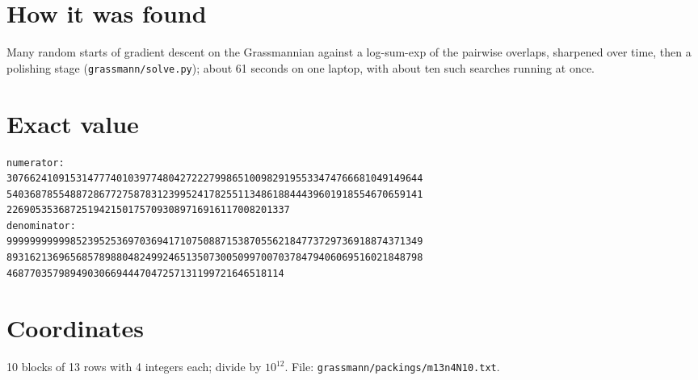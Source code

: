 \documentclass[11pt,a4paper]{article}
\begin{document}
\section{How it was found}
Many random starts of gradient descent on the Grassmannian against a log-sum-exp of the pairwise overlaps, sharpened over time, then a polishing stage (\texttt{grassmann/solve.py}); about 61 seconds on one laptop, with about ten such searches running at once.


\appendix
\section{Exact value}
{\small
\begin{verbatim}
numerator:
307662410915314777401039774804272227998651009829195533474766681049149644
540368785548872867727587831239952417825511348618844439601918554670659141
2269053536872519421501757093089716916117008201337
denominator:
999999999998523952536970369417107508871538705562184773729736918874371349
893162136965685789880482499246513507300509970070378479406069516021848798
468770357989490306694447047257131199721646518114
\end{verbatim}}

\section{Coordinates}
10 blocks of 13 rows with 4 integers each; divide by $10^{12}$. File: \texttt{grassmann/packings/m13n4N10.txt}.
{\tiny
\begin{multicols}{3}
\end{multicols}}
\end{document}
